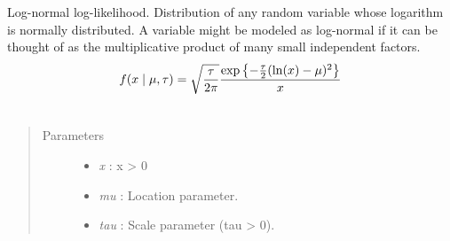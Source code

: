 \documentclass[letterpaper,10pt,english]{sphinxmanual}
\begin{document}
\begin{fulllineitems}
\label{distributions:pymc.distributions.lognormal_like}
Log-normal log-likelihood. Distribution of any random variable whose
logarithm is normally distributed. A variable might be modeled as
log-normal if it can be thought of as the multiplicative product of many
small independent factors.
\begin{gather}
\begin{split}f(x \mid \mu, \tau) = \sqrt{\frac{\tau}{2\pi}}\frac{
\exp\left\{ -\frac{\tau}{2} (\ln(x)-\mu)^2 \right\}}{x}\end{split}\notag\\\begin{split}\end{split}\notag
\end{gather}\begin{quote}\begin{description}
\item[{Parameters }] \leavevmode\begin{itemize}
\item {} 
\emph{x} : x \textgreater{} 0

\item {} 
\emph{mu} : Location parameter.

\item {} 
\emph{tau} : Scale parameter (tau \textgreater{} 0).

\end{itemize}

\end{description}\end{quote}

\end{fulllineitems}

\end{document}
